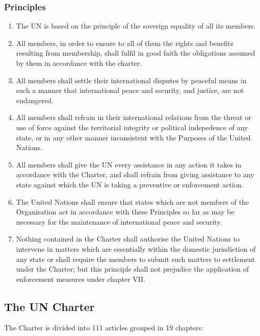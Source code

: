 \documentclass[
  openany]{book}
\providecommand{\tightlist}{%
  \setlength{\itemsep}{0pt}\setlength{\parskip}{0pt}}
\begin{document}
\hypertarget{principles}{%
\subsubsection{Principles}\label{principles}}

\begin{enumerate}
\def\labelenumi{\arabic{enumi}.}
\tightlist
\item
  The UN is based on the principle of the soverign equality of all its members.
\item
  All members, in order to ensure to all of them the rights and benefits resulting from membership, shall fulfil in good faith the obligations assumed by them in accordance with the charter.
\item
  All members shall settle their international disputes by peaceful means in such a manner that international peace and security, and justice, are not endangered.
\item
  All members shall refrain in their international relations from the threat or use of force against the territorial integrity or political indepedence of any state, or in any other manner inconsistent with the Purposes of the United Nations.
\item
  All members shall give the UN every assistance in any action it takes in accordance with the Charter, and shall refrain from giving assistance to any state against which the UN is taking a preventive or enforcement action.
\item
  The United Nations shall ensure that states which are not members of the Organisation act in accordance with these Principles so far as may be necessary for the maintenance of international peace and security.
\item
  Nothing contained in the Charter shall authorise the United Nations to intervene in matters which are essentially within the domestic jurisdiction of any state or shall require the members to submit such matters to settlement under the Charter; but this principle shall not prejudice the application of enforcement measures under chapter VII.
\end{enumerate}

\hypertarget{the-un-charter}{%
\subsection{The UN Charter}\label{the-un-charter}}

The Charter is divided into 111 articles grouped in 19 chapters:
\end{document}
